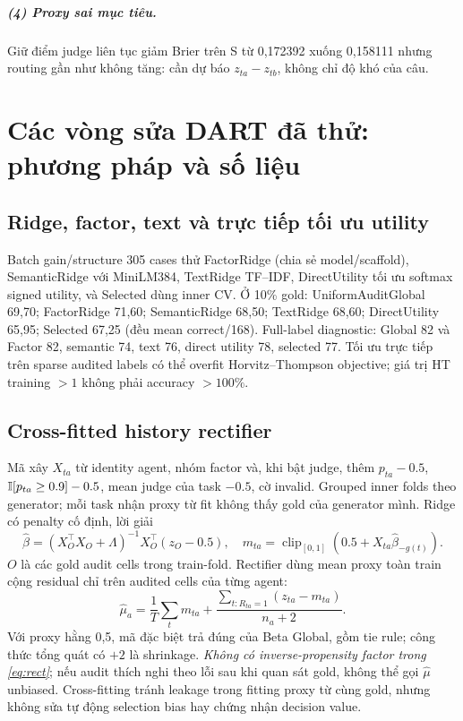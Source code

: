 \documentclass[11pt,a4paper,openany]{book}
\newcommand{\repo}[1]{\path{#1}}
\begin{document}
\paragraph{(4) Proxy sai mục tiêu.} Giữ điểm judge liên tục giảm Brier trên S từ 0,172392 xuống 0,158111 nhưng routing gần như không tăng: cần dự báo \(z_{ta}-z_{tb}\), không chỉ độ khó của câu.

\chapter{Các vòng sửa DART đã thử: phương pháp và số liệu}
\section{Ridge, factor, text và trực tiếp tối ưu utility}
Batch gain/structure 305 cases thử FactorRidge (chia sẻ model/scaffold), SemanticRidge với MiniLM384, TextRidge TF--IDF, DirectUtility tối ưu softmax signed utility, và Selected dùng inner CV. Ở 10\% gold: UniformAuditGlobal 69,70; FactorRidge 71,60; SemanticRidge 68,50; TextRidge 68,60; DirectUtility 65,95; Selected 67,25 (đều mean correct/168). Full-label diagnostic: Global 82 và Factor 82, semantic 74, text 76, direct utility 78, selected 77. Tối ưu trực tiếp trên sparse audited labels có thể overfit Horvitz--Thompson objective; giá trị HT training \(>1\) không phải accuracy \(>100\%\).

\section{Cross-fitted history rectifier}\label{sec:rectifier}
Mã \repo{infra/modal/history_core.py} xây \(X_{ta}\) từ identity agent, nhóm factor và, khi bật judge, thêm \(p_{ta}-0.5\), \(\mathbb I[p_{ta}\ge0.9]-0.5\), mean judge của task \(-0.5\), cờ invalid. Grouped inner folds theo generator; mỗi task nhận proxy từ fit không thấy gold của generator mình. Ridge có penalty cố định, lời giải
\begin{equation}\label{eq:ridge}\hat\beta=(X_O^\top X_O+\Lambda)^{-1}X_O^\top(z_O-0.5),\quad m_{ta}=\operatorname{clip}_{[0,1]}(0.5+X_{ta}\hat\beta_{-g(t)}).
\end{equation}
\(O\) là các gold audit cells trong train-fold. Rectifier dùng mean proxy toàn train cộng residual chỉ trên audited cells của từng agent:
\begin{equation}\label{eq:rect}\hat\mu_a=\frac1T\sum_tm_{ta}+\frac{\sum_{t:R_{ta}=1}(z_{ta}-m_{ta})}{n_a+2}.
\end{equation}
Với proxy hằng 0,5, mã đặc biệt trả đúng \repo{means(observed)} của Beta Global, gồm tie rule; công thức tổng quát có \(+2\) là shrinkage. \emph{Không có inverse-propensity factor trong \eqref{eq:rect}}; nếu audit thích nghi theo lỗi sau khi quan sát gold, không thể gọi \(\hat\mu\) unbiased. Cross-fitting tránh leakage trong fitting proxy từ cùng gold, nhưng không sửa tự động selection bias hay chứng nhận decision value.
\end{document}

